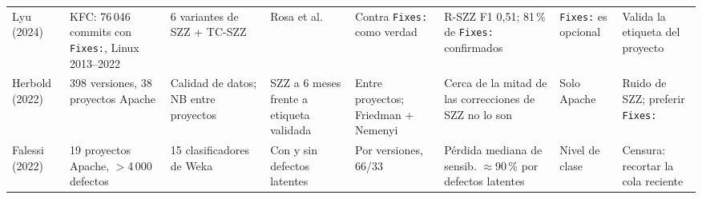 \begin{table}[!t]
\begin{tabularx}{\textwidth}{@{}L{1.05cm}L{2.45cm}L{2.3cm}L{1.75cm}L{1.75cm}L{2.55cm}L{1.95cm}Y@{}}
 Lyu \cite{Lyu2024} (2024) & KFC: 76\,046 commits con \texttt{Fixes:}, Linux 2013--2022 & 6 variantes de SZZ + TC-SZZ & Rosa et al. & Contra \texttt{Fixes:} como verdad & R-SZZ F1 0,51; 81\,\% de \texttt{Fixes:} confirmados & \texttt{Fixes:} es opcional & Valida la etiqueta del proyecto\\
 Herbold \cite{Herbold2022} (2022) & 398 versiones, 38 proyectos Apache & Calidad de datos; NB entre proyectos & SZZ a 6 meses frente a etiqueta validada & Entre proyectos; Friedman + Nemenyi & Cerca de la mitad de las correcciones de SZZ no lo son & Solo Apache & Ruido de SZZ; preferir \texttt{Fixes:}\\
 Falessi \cite{Falessi2022} (2022) & 19 proyectos Apache, $>$4\,000 defectos & 15 clasificadores de Weka & Con y sin defectos latentes & Por versiones, 66/33 & Pérdida mediana de sensib. $\approx$90\,\% por defectos latentes & Nivel de clase & Censura: recortar la cola reciente\\
\bottomrule
\end{tabularx}
\end{table}
